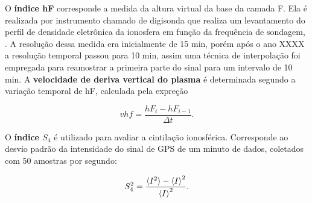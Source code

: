 O {\bf índice hF} corresponde a medida da altura virtual da base da camada F. Ela é realizada por instrumento chamado de digisonda que realiza um levantamento do perfil de densidade eletrônica da ionosfera em função da frequência de sondagem, \cite{BERTONI:1998}. A resolução dessa medida era inicialmente de 15 min, porém após o ano XXXX a resolução temporal passou para 10 min, assim uma técnica de interpolação foi empregada para reamostrar a primeira parte do sinal para um intervalo de 10 min. A {\bf velocidade de deriva vertical do plasma} é determinada segundo a variação temporal de hF, calculada pela expreção

\begin{equation}
vhf=\frac{hF_i-hF_{i-1}}{\Delta t}\mbox{.}
\end{equation}

O {\bf índice $S_4$} é utilizado para avaliar a cintilação ionosférica. Corresponde ao desvio padrão da intensidade do sinal de GPS de um minuto de dados, coletados com 50 amostras por segundo:

\begin{equation}
S_4^2=\frac{\braket{I^2}-\braket{I}^2}{\braket{I}^2}\mbox{.}
\end{equation}
